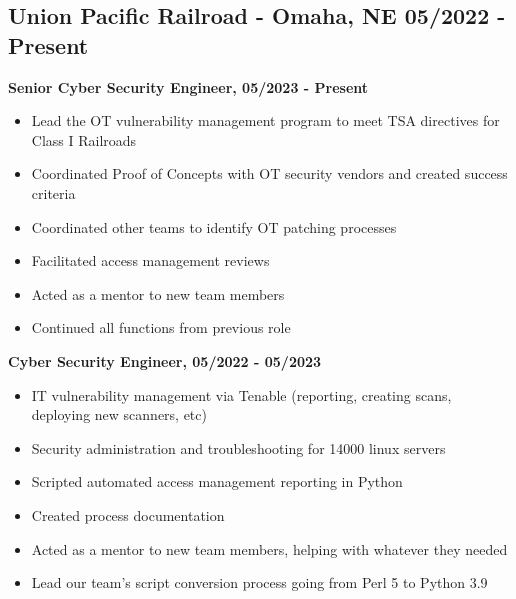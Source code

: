 \documentclass[a4paper,10pt]{article}
\begin{document}
\subsection*{Union Pacific Railroad - Omaha, NE \hfill 05/2022 - Present}
\textbf{Senior Cyber Security Engineer, 05/2023 - Present}
\begin{itemize}
    \leftskip=4em
    \item Lead the OT vulnerability management program to meet TSA directives for Class I Railroads
    \item Coordinated Proof of Concepts with OT security vendors and created success criteria
    \item Coordinated other teams to identify OT patching processes
    \item Facilitated access management reviews
    \item Acted as a mentor to new team members
    \item Continued all functions from previous role
\end{itemize}
\textbf{Cyber Security Engineer, 05/2022 - 05/2023}
\begin{itemize}
    \leftskip=4em
    \item IT vulnerability management via Tenable (reporting, creating scans, deploying new scanners, etc)
    \item Security administration and troubleshooting for 14000 linux servers
    \item Scripted automated access management reporting in Python
    \item Created process documentation
    \item Acted as a mentor to new team members, helping with whatever they needed
    \item Lead our team's script conversion process going from Perl 5 to Python 3.9
\end{itemize}
\end{document}
